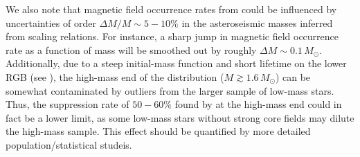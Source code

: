We also note that magnetic field occurrence rates from \cite{Stello_2016} could be influenced by uncertainties of order $\Delta M/M \! \sim \! 5-10 \%$ in the asteroseismic masses inferred from scaling relations. For instance, a sharp jump in magnetic field occurrence rate as a function of mass will be smoothed out by roughly $\Delta M \! \sim \! 0.1 \, M_\odot$. Additionally, due to a steep initial-mass function and short lifetime on the lower RGB (see \cite{Lloyd_2013}), the high-mass end of the distribution ($M \gtrsim 1.6 \, M_\odot$) can be somewhat contaminated by outliers from the larger sample of low-mass stars. Thus, the suppression rate of $50-60\%$ found by \cite{Stello_2016} at the high-mass end could in fact be a lower limit, as some low-mass stars without strong core fields may dilute the high-mass sample. This effect should be quantified by more detailed population/statistical studeis.

